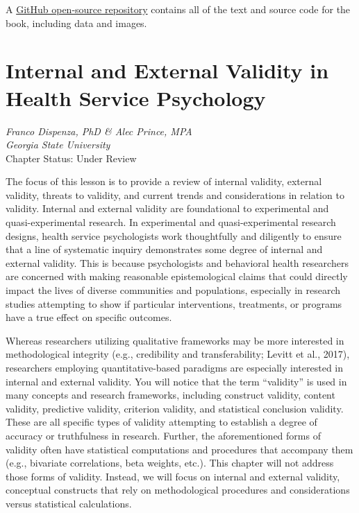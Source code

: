 \documentclass[
  11pt,
]{book}
\begin{document}
A \href{https://github.com/lhbikos/ReC_MultivModel}{GitHub open-source repository} contains all of the text and source code for the book, including data and images.

\hypertarget{InExVal}{%
\chapter{Internal and External Validity in Health Service Psychology}\label{InExVal}}

\emph{Franco Dispenza, PhD \& Alec Prince, MPA}\\
\emph{Georgia State University}\\
Chapter Status: Under Review

The focus of this lesson is to provide a review of internal validity, external validity, threats to validity, and current trends and considerations in relation to validity. Internal and external validity are foundational to experimental and quasi-experimental research. In experimental and quasi-experimental research designs, health service psychologists work thoughtfully and diligently to ensure that a line of systematic inquiry demonstrates some degree of internal and external validity. This is because psychologists and behavioral health researchers are concerned with making reasonable epistemological claims that could directly impact the lives of diverse communities and populations, especially in research studies attempting to show if particular interventions, treatments, or programs have a true effect on specific outcomes.

Whereas researchers utilizing qualitative frameworks may be more interested in methodological integrity (e.g., credibility and transferability; Levitt et al., 2017), researchers employing quantitative-based paradigms are especially interested in internal and external validity. You will notice that the term ``validity'' is used in many concepts and research frameworks, including construct validity, content validity, predictive validity, criterion validity, and statistical conclusion validity. These are all specific types of validity attempting to establish a degree of accuracy or truthfulness in research. Further, the aforementioned forms of validity often have statistical computations and procedures that accompany them (e.g., bivariate correlations, beta weights, etc.). This chapter will not address those forms of validity. Instead, we will focus on internal and external validity, conceptual constructs that rely on methodological procedures and considerations versus statistical calculations.
\end{document}
